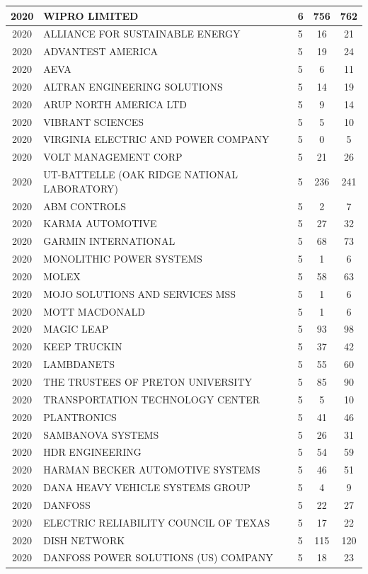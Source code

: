 \documentclass{article}%
\begin{document}
\begin{longtable}{c|p{20em}|p{5em}|c|c}
\hline%
2020&WIPRO LIMITED&6&756&762\\%
\hline%
2020&ALLIANCE FOR SUSTAINABLE ENERGY&5&16&21\\%
\hline%
2020&ADVANTEST AMERICA&5&19&24\\%
\hline%
2020&AEVA&5&6&11\\%
\hline%
2020&ALTRAN ENGINEERING SOLUTIONS&5&14&19\\%
\hline%
2020&ARUP NORTH AMERICA LTD&5&9&14\\%
\hline%
2020&VIBRANT SCIENCES&5&5&10\\%
\hline%
2020&VIRGINIA ELECTRIC AND POWER COMPANY&5&0&5\\%
\hline%
2020&VOLT MANAGEMENT CORP&5&21&26\\%
\hline%
2020&UT{-}BATTELLE  (OAK RIDGE NATIONAL LABORATORY)&5&236&241\\%
\hline%
2020&ABM CONTROLS&5&2&7\\%
\hline%
2020&KARMA AUTOMOTIVE&5&27&32\\%
\hline%
2020&GARMIN INTERNATIONAL&5&68&73\\%
\hline%
2020&MONOLITHIC POWER SYSTEMS&5&1&6\\%
\hline%
2020&MOLEX&5&58&63\\%
\hline%
2020&MOJO SOLUTIONS AND SERVICES MSS&5&1&6\\%
\hline%
2020&MOTT MACDONALD&5&1&6\\%
\hline%
2020&MAGIC LEAP&5&93&98\\%
\hline%
2020&KEEP TRUCKIN&5&37&42\\%
\hline%
2020&LAMBDANETS&5&55&60\\%
\hline%
2020&THE TRUSTEES OF PRETON UNIVERSITY&5&85&90\\%
\hline%
2020&TRANSPORTATION TECHNOLOGY CENTER&5&5&10\\%
\hline%
2020&PLANTRONICS&5&41&46\\%
\hline%
2020&SAMBANOVA SYSTEMS&5&26&31\\%
\hline%
2020&HDR ENGINEERING&5&54&59\\%
\hline%
2020&HARMAN BECKER AUTOMOTIVE SYSTEMS&5&46&51\\%
\hline%
2020&DANA HEAVY VEHICLE SYSTEMS GROUP&5&4&9\\%
\hline%
2020&DANFOSS&5&22&27\\%
\hline%
2020&ELECTRIC RELIABILITY COUNCIL OF TEXAS&5&17&22\\%
\hline%
2020&DISH NETWORK&5&115&120\\%
\hline%
2020&DANFOSS POWER SOLUTIONS (US) COMPANY&5&18&23\\%

\end{longtable}
\end{document}
